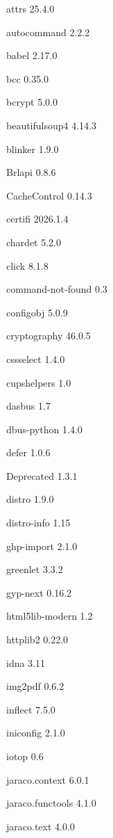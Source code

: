 \documentclass[11pt,a4paper]{article}
\begin{document}
attrs                     25.4.0

autocommand               2.2.2

babel                     2.17.0

bcc                       0.35.0

bcrypt                    5.0.0

beautifulsoup4            4.14.3

blinker                   1.9.0

Brlapi                    0.8.6

CacheControl              0.14.3

certifi                   2026.1.4

chardet                   5.2.0

click                     8.1.8

command-not-found         0.3

configobj                 5.0.9

cryptography              46.0.5

cssselect                 1.4.0

cupshelpers               1.0

dasbus                    1.7

dbus-python               1.4.0

defer                     1.0.6

Deprecated                1.3.1

distro                    1.9.0

distro-info               1.15

ghp-import                2.1.0

greenlet                  3.3.2

gyp-next                  0.16.2

html5lib-modern           1.2

httplib2                  0.22.0

idna                      3.11

img2pdf                   0.6.2

inflect                   7.5.0

iniconfig                 2.1.0

iotop                     0.6

jaraco.context            6.0.1

jaraco.functools          4.1.0

jaraco.text               4.0.0
\end{document}
